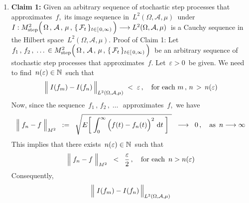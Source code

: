 \begin{enumerate}
\item
	\textbf{Claim 1:}\quad
	Given an arbitrary sequence of stochastic step processes that approximates \,$f$,\,
	its image sequence in \,$L^{2}(\Omega,\mathcal{A},\mu)$\, under
	\,$I : M^{2}_{\textnormal{step}}\!
	\left(\,
		\overset{{\color{white}.}}{\Omega} \,,\, \mathcal{A} \,,\, \mu \,,\, \{\,\mathcal{F}_{t}\,\}_{t \in [\,0,\infty)}
		\,\right)\longrightarrow L^{2}(\Omega,\mathcal{A},\mu)$\,
	is a Cauchy sequence in the Hilbert space \,$L^{2}(\Omega,\mathcal{A},\mu)$.
	\vskip 0.2cm
	\noindent
	Proof of Claim 1:\quad
	Let
	\,$f_{1}\,,\, f_{2}\,,\; \ldots\, \in M^{2}_{\textnormal{step}}\!
	\left(\,
		\overset{{\color{white}.}}{\Omega} \,,\, \mathcal{A} \,,\, \mu \,,\, \{\,\mathcal{F}_{t}\,\}_{t \in [\,0,\infty)}
		\,\right)$\,
	be an arbitrary sequence of stochastic step processes that approximates \,$f$.
	Let \,$\varepsilon > 0$\, be given.
	We need to find \,$n(\varepsilon) \in \mathbb{N}$\, such that
	\begin{equation*}
	\left\Vert\; I(f_{m}) \overset{{\color{white}.}}{-} I(f_{n}) \,\right\Vert_{L^{2}(\Omega,\mathcal{A},\mu)} \; < \; \varepsilon\,,
	\quad\textnormal{for each $m \,,\, n \, > \, n(\varepsilon)$}
	\end{equation*}
	Now, since the sequence \,$f_{1}\,,\, f_{2}\,,\; \ldots\,$\, approximates \,$f$,\,
	we have
	\begin{equation*}
	\left\Vert\; f_{n} \overset{{\color{white}.}}{-} f \;\right\Vert_{M^{2}}
	\;\; := \;\;
	\sqrt{E\!\left[\;\int_{0}^{\infty}\left(f(t)\overset{{\color{white}.}}{-}f_{n}(t)\right)^{2}\,\d t\;\right]{\color{white}.}}
	\;\; \longrightarrow \;\; 0\,,
	\quad
	\textnormal{as \,$n \longrightarrow \infty$}
	\end{equation*}
	This implies that there exists \,$n(\varepsilon) \in \mathbb{N}$\, such that
	\begin{equation*}
	\left\Vert\; f_{n} \overset{{\color{white}.}}{-} f \;\right\Vert_{M^{2}}
	\;\; < \;\;
		\dfrac{\varepsilon}{2}\,,
	\quad
	\textnormal{for each \,$n > n(\varepsilon)$}
	\end{equation*}
	Consequently,
	\begin{eqnarray*}
	\left\Vert\; I(f_{m}) \overset{{\color{white}.}}{-} I(f_{n}) \,\right\Vert_{L^{2}(\Omega,\mathcal{A},\mu)}

\end{eqnarray*}
\end{enumerate}

